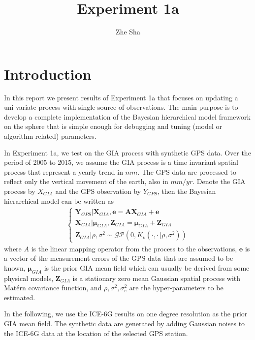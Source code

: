 \documentclass[a4paper,12pt]{article}
\begin{document}
\title{Experiment 1a}
\author{Zhe Sha}
\maketitle

\onehalfspacing
{}

\section{Introduction}
In this report we present results of Experiment 1a that focuses on updating a uni-variate process with single source of observations. The main purpose is to develop a complete implementation of the Bayesian hierarchical model framework on the sphere that is simple enough for debugging and tuning (model or algorithm related) parameters.

In Experiment 1a, we test on the GIA process with synthetic GPS data. Over the period of 2005 to 2015, we assume the GIA process is a time invariant spatial process that represent a yearly trend in $mm$. The GPS data are processed to reflect only the vertical movement of the earth, also in $mm/yr$. Denote the GIA process by $X_{GIA}$ and the GPS observation by $Y_{GPS}$, then the Bayesian hierarchical model can be written as
\begin{align}
\left\{\begin{array}{l}
\bm{Y}_{GPS} | \bm{X}_{GIA}, \bm{e} = \bm{A} \bm{X}_{GIA} + \bm{e} \\
\bm{X}_{GIA} | \bm{\mu}_{GIA}, \bm{Z}_{GIA} = \bm{\mu}_{GIA} + \bm{Z}_{GIA} \\
\bm{Z}_{GIA} | \rho, \sigma^2 \sim \mathcal{GP}(0, K_{\nu}(\cdot, \cdot \, | \rho, \sigma^2))
\end{array}
\right.
\end{align} 
where $A$ is the linear mapping operator from the process to the observations, $\bm{e}$ is a vector of the measurement errors of the GPS data that are assumed to be known, $\bm{\mu}_{GIA}$ is the prior GIA mean field which can usually be derived from some physical models, $\bm{Z}_{GIA}$ is a stationary zero mean Gaussian spatial process with Mat\'{e}rn covariance function, and $\rho, \sigma^2, \sigma_e^2$ are the hyper-parameters to be estimated.   

In the following, we use the ICE-6G results on one degree resolution as the prior GIA mean field. The synthetic data are generated by adding Gaussian noises to the ICE-6G data at the location of the selected GPS station. 
\end{document}
